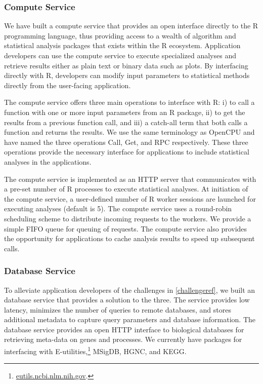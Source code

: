 \subsubsection{Compute Service}
We have built a compute service that provides an open interface directly to the
R programming language, thus providing access to a wealth of algorithm and
statistical analysis packages that exists within the R ecosystem.  
Application developers can use the compute service to execute specialized
analyses and retrieve results either as plain text or binary data such as plots.
By interfacing directly with R, developers can modify input parameters to
statistical methods directly from the user-facing application. 

The compute service offers three main operations to interface with R: i) to call
a function with one or more input parameters from an R package, ii) to get the
results from a previous function call, and iii) a catch-all term that both calls
a function and returns the results.  We use the same terminology as
OpenCPU\cite{opencpu} and have named the three operations Call, Get, and RPC
respectively. These three operations provide the necessary interface for
applications to include statistical analyses in the applications.

The compute service is implemented as an HTTP server that communicates with a
pre-set number of R processes to execute statistical analyses. 
At initiation of the compute service, a user-defined number of R worker sessions
are launched for executing analyses (default is 5).  
The compute service uses a round-robin scheduling scheme to distribute incoming
requests to the workers. We provide a simple FIFO queue for queuing of requests.
The compute service also provides the opportunity for applications to cache
analysis results to speed up subsequent calls. 

\subsubsection{Database Service} 
To alleviate application developers of the challenges in \ref{challengeref}, we
built an database service that provides a solution to the three. The service
provides low latency, minimizes the number of queries to remote databases, and
stores additional metadata to capture query parameters and database information.
The database service provides an open HTTP interface to biological databases for
retrieving meta-data on genes and processes.  We currently have packages for
interfacing with E-utilities,\footnote{\url{eutils.ncbi.nlm.nih.gov}.} MSigDB,
HGNC, and KEGG.

